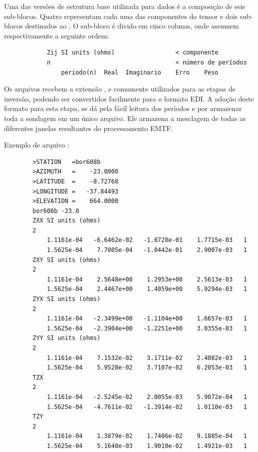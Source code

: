         Uma das versões de estrutura base utilizada para dados é a composição de seis sub-blocos. Quatro representam cada uma das componentes do tensor e dois sub-blocos destinados ao  \cite{padua2004estudos}. O sub-bloco é divido em cinco colunas, onde assumem respectivamente a seguinte ordem: 
        
\begin{footnotesize}        
\begin{verbatim}
            Zij SI units (ohms)                 < componente
            n                                   < número de períodos
                periodo(n)  Real  Imaginario    Erro    Peso
\end{verbatim}
\end{footnotesize}
               
        Os arquivos  recebem a extensão , e comumente utilizados para as etapas de inversão, podendo ser convertidos facilmente para o formato EDI. A adoção deste formato para esta etapa, se dá pela fácil leitura dos períodos e por armazenar toda a sondagem em um único arquivo. Ele armazena a mesclagem de todas as diferentes janelas resultantes do processamento EMTF.
        
        Exemplo de arquivo :
        
\begin{footnotesize}        
\begin{verbatim}
        >STATION   =bor608b
        >AZIMUTH   =    -23.0000
        >LATITUDE  =    -8.72768
        >LONGITUDE =   -37.84493
        >ELEVATION =    664.0000
        bor608b -23.0
        ZXX SI units (ohms)
        2
            1.1161e-04   -6.6462e-02   -1.0728e-01    1.7715e-03   1
            1.5625e-04    7.7005e-04   -1.0442e-01    2.9007e-03   1
        ZXY SI units (ohms)
        2
            1.1161e-04    2.5648e+00    1.2953e+00    2.5613e-03   1
            1.5625e-04    2.4467e+00    1.4059e+00    5.9294e-03   1
        ZYX SI units (ohms)
        2
            1.1161e-04   -2.3499e+00   -1.1104e+00    1.6657e-03   1
            1.5625e-04   -2.3904e+00   -1.2251e+00    3.0355e-03   1
        ZYY SI units (ohms)
        2
            1.1161e-04    7.1532e-02    3.1711e-02    2.4082e-03   1
            1.5625e-04    5.9528e-02    3.7107e-02    6.2053e-03   1
        TZX
        2
            1.1161e-04   -2.5245e-02    2.0055e-03    5.9072e-04   1
            1.5625e-04   -4.7611e-02   -1.3914e-02    1.0110e-03   1
        TZY
        2
            1.1161e-04    1.3879e-02    1.7406e-02    9.1885e-04   1
            1.5625e-04    5.1640e-03    1.9010e-02    1.4921e-03   1            
\end{verbatim}
\end{footnotesize}
    
